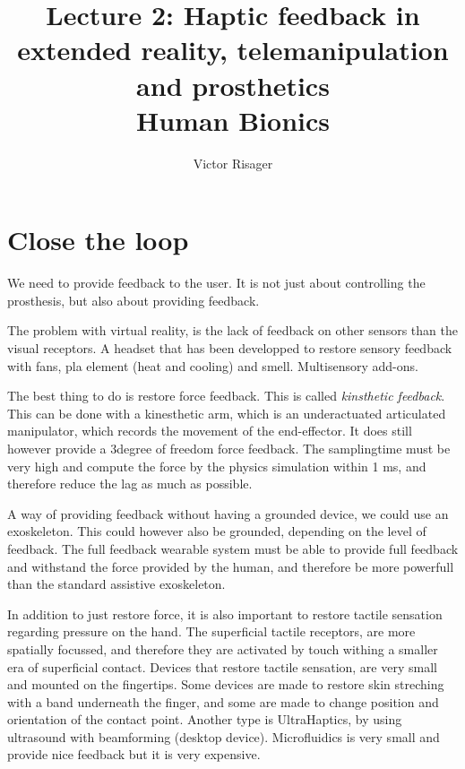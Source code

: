 \documentclass[a4paper]{article}
\title{Lecture 2: Haptic feedback in extended reality, telemanipulation and prosthetics  \\
	\large Human Bionics}
\author{Victor Risager}
\begin{document}
\maketitle

\section{Close the loop}
We need to provide feedback to the user. It is not just about controlling the prosthesis, but also about providing feedback. 

The problem with virtual reality, is the lack of feedback on other sensors than the visual receptors. A headset that has been developped to restore sensory feedback with fans, pla element (heat and cooling) and smell. Multisensory add-ons.

\vspace{5pt}


The best thing to do is restore force feedback. This is called \textit{kinsthetic feedback}. This can be done with a kinesthetic arm, which is an underactuated articulated manipulator, which records the movement of the end-effector. It does still however provide a 3degree of freedom force feedback. The samplingtime must be very high and compute the force by the physics simulation within 1 ms, and therefore reduce the lag as much as possible. 

\vspace{5pt}

A way of providing feedback without having a grounded device, we could use an exoskeleton. This could however also be grounded, depending on the level of feedback. The full feedback wearable system must be able to provide full feedback and withstand the force provided by the human, and therefore be more powerfull than the standard assistive exoskeleton. 

\vspace{5pt}

In addition to just restore force, it is also important to restore tactile sensation regarding pressure on the hand. The superficial tactile receptors, are more spatially focussed, and therefore they are activated by touch withing a smaller era of superficial contact. Devices that restore tactile sensation, are very small and mounted on the fingertips. Some devices are made to restore skin streching with a band underneath the finger, and some are made to change position and orientation of the contact point. Another type is UltraHaptics, by using ultrasound with beamforming (desktop device). Microfluidics is very small and provide nice feedback but it is very expensive. 
\end{document}
